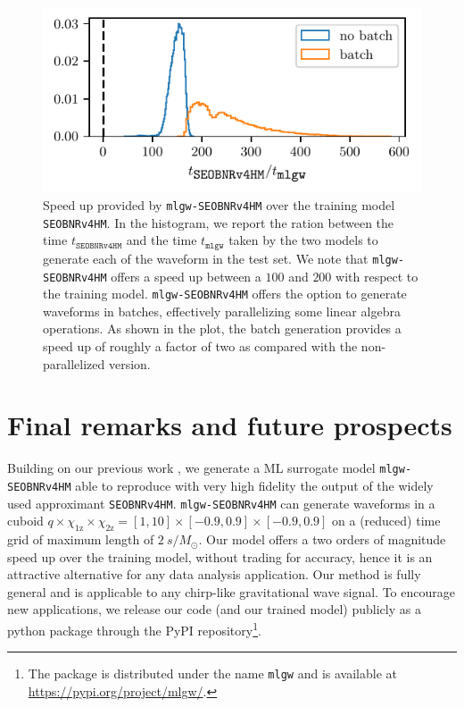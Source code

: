 \documentclass[twocolumn,showpacs,preprintnumbers,nofootinbib,prd,
superscriptaddress,10pt]{revtex4-1}
\begin{document}
{\begin{figure}[t]
	\centering
	\includegraphics[scale = 1]{timing}
	\caption{Speed up provided by \texttt{mlgw-SEOBNRv4HM} over the training model \texttt{SEOBNRv4HM}.
	In the histogram, we report the ration between the time $t_\texttt{SEOBNRv4HM}$ and the time $t_\texttt{mlgw}$ taken by the two models to generate each of the waveform in the test set.
	We note that \texttt{mlgw-SEOBNRv4HM} offers a speed up between a $100$ and $200$ with respect to the training model.
	\texttt{mlgw-SEOBNRv4HM} offers the option to generate waveforms in batches, effectively parallelizing some linear algebra operations. As shown in the plot, the batch generation provides a speed up of roughly a factor of two as compared with the non-parallelized version.
	}
	\label{fig:timing_hist}
\end{figure}


\section{Final remarks and future prospects}
\label{sec:end}

Building on our previous work \cite{Schmidt:2020yuu}, we generate a ML surrogate model \texttt{mlgw-SEOBNRv4HM} able to reproduce with very high fidelity the output of the widely used approximant \texttt{SEOBNRv4HM}. \texttt{mlgw-SEOBNRv4HM} can generate waveforms in a cuboid $q\times \chi_\text{1z} \times \chi_\text{2z} = [1,10]\times[-0.9,0.9]\times[-0.9,0.9]$ on a (reduced) time grid of maximum length of $\SI{2}{s/M_\odot}$.
Our model offers a two orders of magnitude speed up over the training model, without trading for accuracy, hence it is an attractive alternative for any data analysis application.
Our method is fully general and is applicable to any chirp-like gravitational wave signal.
To encourage new applications, we release our code (and our trained model) publicly as a python package through the PyPI repository\footnote{The package is distributed under the name \texttt{mlgw} and is available at \url{https://pypi.org/project/mlgw/}.}.

}
\end{document}
